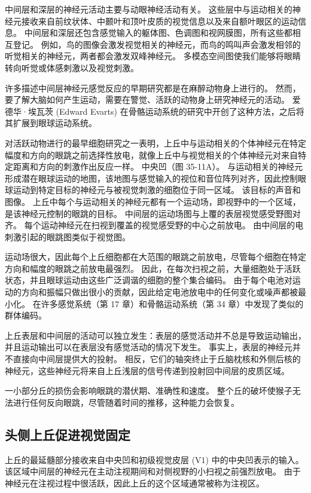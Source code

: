 中间层和深层的神经元活动主要与动眼神经活动有关。 这些层中与运动相关的神经元接收来自前纹状体、中颞叶和顶叶皮质的视觉信息以及来自额叶眼区的运动信息。 中间层和深层还包含感觉输入的躯体图、色调图和视网膜图，所有这些都相互登记。 例如，鸟的图像会激发视觉相关的神经元，而鸟的鸣叫声会激发相邻的听觉相关的神经元，两者都会激发双峰神经元。 多模态空间图使我们能够将眼睛转向听觉或体感刺激以及视觉刺激。

许多描述中间层神经元感觉反应的早期研究都是在麻醉动物身上进行的。 然而，要了解大脑如何产生运动，需要在警觉、活跃的动物身上研究神经元的活动。 爱德华·埃瓦茨 (Edward Evarts) 在骨骼运动系统的研究中开创了这种方法，之后将其扩展到眼球运动系统。

对活跃动物进行的最早细胞研究之一表明，上丘中与运动相关的个体神经元在特定幅度和方向的眼跳之前选择性放电，就像上丘中与视觉相关的个体神经元对来自特定距离和方向的刺激作出反应一样。 中央凹（图 35-11A）。 与运动相关的神经元形成潜在眼球运动的地图，该地图与感觉输入的视位和音位阵列对齐，因此控制眼球运动到特定目标的神经元与被视觉刺激的细胞位于同一区域。 该目标的声音和图像。 上丘中每个与运动相关的神经元都有一个运动场，即视野中的一个区域，是该神经元控制的眼跳的目标。 中间层的运动场图与上覆的表层视觉感受野图对齐。 每个运动神经元在扫视到覆盖的视觉感受野的中心之前放电。 由中间层的电刺激引起的眼跳图类似于视觉图。

运动场很大，因此每个上丘细胞都在大范围的眼跳之前放电，尽管每个细胞在特定方向和幅度的眼跳之前放电最强烈。 因此，在每次扫视之前，大量细胞处于活跃状态，并且眼球运动由这些广泛调谐的细胞的整个集合编码。 由于每个电池对运动的方向和振幅只做出很小的贡献，因此给定电池放电中的任何变化或噪声都被最小化。 在许多感觉系统（第 17 章）和骨骼运动系统（第 34 章）中发现了类似的群体编码。

上丘表层和中间层的活动可以独立发生：表层的感觉活动并不总是导致运动输出，并且运动输出可以在表层没有感觉活动的情况下发生。 事实上，表层的神经元并不直接向中间层提供大的投射。 相反，它们的轴突终止于丘脑枕核和外侧后核的神经元，这些神经元将来自上丘浅层的信号传递到投射回中间层的皮质区域。

一小部分丘的损伤会影响眼跳的潜伏期、准确性和速度。 整个丘的破坏使猴子无法进行任何反向眼跳，尽管随着时间的推移，这种能力会恢复。

\subsection{头侧上丘促进视觉固定}
上丘的最延髓部分接收来自中央凹和初级视觉皮层 (V1) 中的中央凹表示的输入。 该区域中间层的神经元在主动注视期间和对侧视野的小扫视之前强烈放电。 由于神经元在注视过程中很活跃，因此上丘的这个区域通常被称为注视区。

